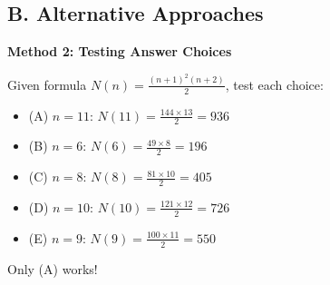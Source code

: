 \documentclass[12pt]{article}
\begin{document}
\begin{solutionbox}
\subsection*{B. Alternative Approaches}

\textbf{Method 2: Testing Answer Choices}

Given formula $N(n) = \frac{(n+1)^2(n+2)}{2}$, test each choice:
\begin{itemize}
    \item (A) $n=11$: $N(11) = \frac{144 \times 13}{2} = 936$ \checkmark
    \item (B) $n=6$: $N(6) = \frac{49 \times 8}{2} = 196$
    \item (C) $n=8$: $N(8) = \frac{81 \times 10}{2} = 405$
    \item (D) $n=10$: $N(10) = \frac{121 \times 12}{2} = 726$
    \item (E) $n=9$: $N(9) = \frac{100 \times 11}{2} = 550$
\end{itemize}

Only (A) works!

\end{solutionbox}
\end{document}
